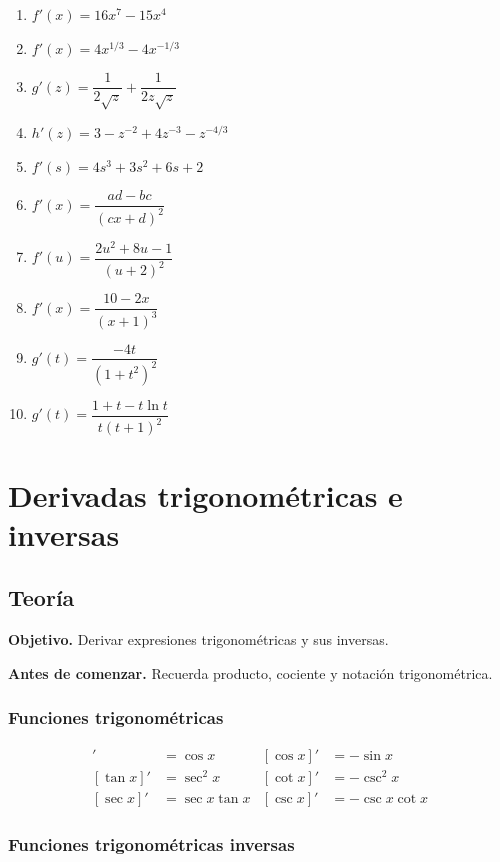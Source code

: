 \documentclass[12pt]{article}
\begin{document}
\begin{enumerate}
    \item $f'(x) = 16x^7 - 15x^4$
    \item $f'(x) = 4x^{1/3} - 4x^{-1/3}$
    \item $g'(z) = \dfrac{1}{2\sqrt{z}} + \dfrac{1}{2z\sqrt{z}}$
    \item $h'(z) = 3 - z^{-2} + 4z^{-3} - z^{-4/3}$
    \item $f'(s) = 4s^3 + 3s^2 + 6s + 2$
    \item $f'(x) = \dfrac{ad - bc}{(cx + d)^2}$
    \item $f'(u) = \dfrac{2u^2 + 8u - 1}{(u + 2)^2}$
    \item $f'(x) = \dfrac{10 - 2x}{(x + 1)^3}$
    \item $g'(t) = \dfrac{-4t}{(1 + t^2)^2}$
    \item $g'(t) = \dfrac{1 + t - t\ln t}{t(t + 1)^2}$
\end{enumerate}



\section{Derivadas trigonométricas e inversas}

\subsection{Teoría}

\textbf{Objetivo.} Derivar expresiones trigonométricas y sus inversas.

\textbf{Antes de comenzar.} Recuerda producto, cociente y notación trigonométrica.

\subsubsection{Funciones trigonométricas}


\begin{align*}
[\sin x]' &= \cos x & [\cos x]' &= -\sin x \\
[\tan x]' &= \sec^2 x & [\cot x]' &= -\csc^2 x \\
[\sec x]' &= \sec x \tan x & [\csc x]' &= -\csc x \cot x
\end{align*}



\subsubsection{Funciones trigonométricas inversas}
\end{document}
